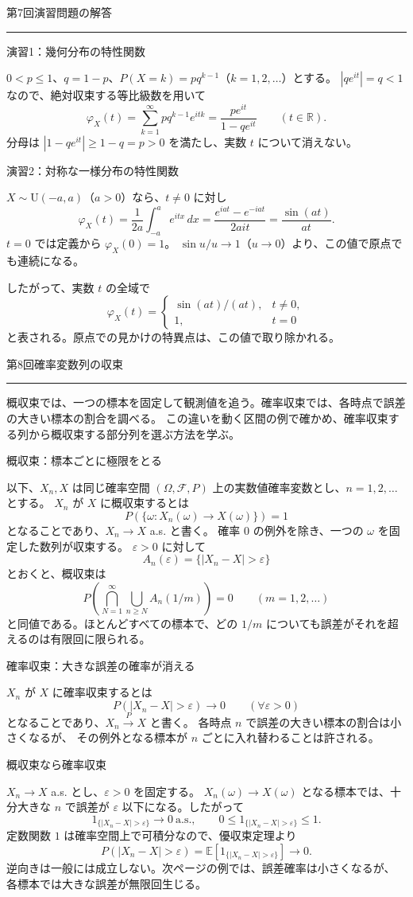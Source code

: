 \documentclass[a4paper,10pt,pdflatex,ja=standard,jafont=ipaex-type1,
  magstyle=real,scale=1]{bxjsarticle}
\newcommand{\coursename}{確率論と統計学 I}
\newcommand{\topic}[1]{\par\vspace{5pt}
  {\large\sffamily\mdseries\color{accent}#1}\par\vspace{2pt}}
\newcommand{\handouttitle}[1]{%
  \begin{center}
    {\Large\color{ink}#1}\par\vspace{3mm}
    {\color{accent}\rule{0.88\linewidth}{0.7pt}}
  \end{center}\vspace{-2mm}}
\newcommand{\keybox}[1]{\par\vspace{3pt}\begingroup
  \setlength{\fboxsep}{5pt}
  \colorbox{soft}{\parbox{\dimexpr\linewidth-2\fboxsep\relax}{#1}}%
  \endgroup\par\vspace{2pt}}
\newcommand{\F}{\mathcal F}
\newcommand{\R}{\mathbb R}
\newcommand{\E}{\mathbb E}
\newcommand{\ind}{\mathrm{1}}
\begin{document}
\fontsize{10pt}{13.5pt}\selectfont
\begingroup
\fancyhead[L]{\small\color{ink}\coursename{}・前回の演習解答}
\handouttitle{第7回\quad 演習問題の解答}

\topic{演習1：幾何分布の特性関数}
$0<p\le1$、$q=1-p$、$P(X=k)=pq^{k-1}$（$k=1,2,\ldots$）とする。
$|qe^{it}|=q<1$ なので、絶対収束する等比級数を用いて
$$
  \varphi_X(t)=\sum_{k=1}^\infty pq^{k-1}e^{itk}
    =\frac{pe^{it}}{1-qe^{it}}\qquad(t\in\R).
$$
分母は $|1-qe^{it}|\ge1-q=p>0$ を満たし、実数 $t$ について消えない。

\topic{演習2：対称な一様分布の特性関数}
$X\sim\mathrm U(-a,a)$（$a>0$）なら、$t\ne0$ に対し
$$
  \varphi_X(t)=\frac1{2a}\int_{-a}^a e^{itx}\,dx
    =\frac{e^{iat}-e^{-iat}}{2ait}=\frac{\sin(at)}{at}.
$$
$t=0$ では定義から $\varphi_X(0)=1$。
$\sin u/u\to1$（$u\to0$）より、この値で原点でも連続になる。

したがって、実数 $t$ の全域で
$$
 \varphi_X(t)=
 \begin{cases}
  \sin(at)/(at),&t\ne0,\\
  1,&t=0
 \end{cases}
$$
と表される。原点での見かけの特異点は、この値で取り除かれる。
\clearpage
\endgroup

\handouttitle{第8回\quad 確率変数列の収束}
\keybox{概収束では、一つの標本を固定して観測値を追う。確率収束では、各時点で誤差の大きい標本の割合を調べる。
この違いを動く区間の例で確かめ、確率収束する列から概収束する部分列を選ぶ方法を学ぶ。}

\topic{概収束：標本ごとに極限をとる}
以下、$X_n,X$ は同じ確率空間 $(\Omega,\F,P)$ 上の実数値確率変数とし、$n=1,2,\ldots$ とする。
$X_n$ が $X$ に概収束するとは
$$P(\{\omega:X_n(\omega)\to X(\omega)\})=1$$
となることであり、$X_n\to X$ a.s. と書く。
確率 $0$ の例外を除き、一つの $\omega$ を固定した数列が収束する。
$\varepsilon>0$ に対して
$$A_n(\varepsilon)=\{|X_n-X|>\varepsilon\}$$
とおくと、概収束は
$$P\left(\bigcap_{N=1}^\infty\bigcup_{n\ge N}A_n(1/m)\right)=0
 \qquad(m=1,2,\ldots)$$
と同値である。ほとんどすべての標本で、どの $1/m$ についても誤差がそれを超えるのは有限回に限られる。

\topic{確率収束：大きな誤差の確率が消える}
$X_n$ が $X$ に確率収束するとは
$$P(|X_n-X|>\varepsilon)\longrightarrow0
 \qquad(\forall\varepsilon>0)$$
となることであり、$X_n\xrightarrow{P}X$ と書く。
各時点 $n$ で誤差の大きい標本の割合は小さくなるが、
その例外となる標本が $n$ ごとに入れ替わることは許される。

\topic{概収束なら確率収束}
$X_n\to X$ a.s. とし、$\varepsilon>0$ を固定する。
$X_n(\omega)\to X(\omega)$ となる標本では、十分大きな $n$ で誤差が $\varepsilon$ 以下になる。したがって
$$\ind_{\{|X_n-X|>\varepsilon\}}\to0\ \text{a.s.},\qquad
 0\le\ind_{\{|X_n-X|>\varepsilon\}}\le1.$$
定数関数 $1$ は確率空間上で可積分なので、優収束定理より
$$P(|X_n-X|>\varepsilon)=\E[\ind_{\{|X_n-X|>\varepsilon\}}]\to0.$$
逆向きは一般には成立しない。次ページの例では、誤差確率は小さくなるが、
各標本では大きな誤差が無限回生じる。
\end{document}
